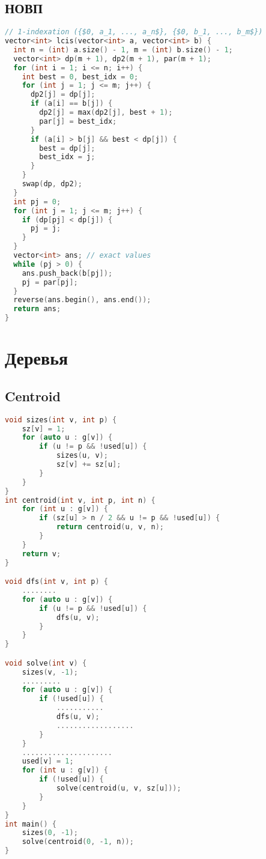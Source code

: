 \documentclass[10pt,a4paper,landscape,twosided]{extarticle}
\begin{document}
\begin{multicols*}{3}
\subsection{НОВП}
\begin{lstlisting}[language=C++]
// 1-indexation ({$0, a_1, ..., a_n$}, {$0, b_1, ..., b_m$})
vector<int> lcis(vector<int> a, vector<int> b) {
  int n = (int) a.size() - 1, m = (int) b.size() - 1;
  vector<int> dp(m + 1), dp2(m + 1), par(m + 1);
  for (int i = 1; i <= n; i++) {
    int best = 0, best_idx = 0;
    for (int j = 1; j <= m; j++) {
      dp2[j] = dp[j];
      if (a[i] == b[j]) {
        dp2[j] = max(dp2[j], best + 1);
        par[j] = best_idx;
      }
      if (a[i] > b[j] && best < dp[j]) {
        best = dp[j];
        best_idx = j;
      }
    }
    swap(dp, dp2);
  }
  int pj = 0;
  for (int j = 1; j <= m; j++) {
    if (dp[pj] < dp[j]) {
      pj = j;
    }
  }
  vector<int> ans; // exact values
  while (pj > 0) {
    ans.push_back(b[pj]);
    pj = par[pj];
  }
  reverse(ans.begin(), ans.end());
  return ans;
}
\end{lstlisting}

\section{Деревья}

\subsection{Centroid}
\begin{lstlisting}[language=C++]
void sizes(int v, int p) {
    sz[v] = 1;
    for (auto u : g[v]) {
        if (u != p && !used[u]) {
            sizes(u, v);
            sz[v] += sz[u];
        }
    }
}
int centroid(int v, int p, int n) {
    for (int u : g[v]) {
        if (sz[u] > n / 2 && u != p && !used[u]) {
            return centroid(u, v, n);
        }
    }
    return v;
}

void dfs(int v, int p) {
    ........
    for (auto u : g[v]) {
        if (u != p && !used[u]) {
            dfs(u, v);
        }
    }
}

void solve(int v) {
    sizes(v, -1);
    .........
    for (auto u : g[v]) {
        if (!used[u]) {
            ...........
            dfs(u, v);   
            ..................     
        }
    }
    .....................
    used[v] = 1;
    for (int u : g[v]) {
        if (!used[u]) {
            solve(centroid(u, v, sz[u]));
        }
    }
}
int main() {
    sizes(0, -1);
    solve(centroid(0, -1, n));
}



\end{lstlisting}
\end{multicols*}
\end{document}
